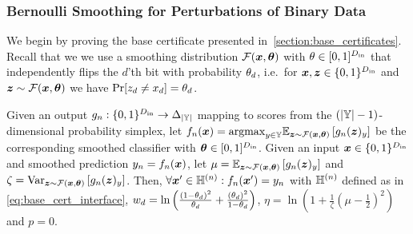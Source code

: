 \subsubsection{Bernoulli Smoothing for Perturbations of Binary Data}\label{section:appendix_bernoulli_cert}
We begin by proving the base certificate presented in~\autoref{section:base_certificates}.
Recall that we  we use a smoothing distribution
$\mathcal{F}({\bm{x}}, {\bm{\theta}})$ with ${\theta} \in [0,1]^{D_\mathrm{in}}$ that independently flips the $d$'th bit with probability ${\theta}_d$, i.e.~for ${\bm{x}}, {\bm{z}} \in \{0,1\}^{D_\mathrm{in}}$ and ${\bm{z}} \sim \mathcal{F}({\bm{x}}, {\bm{\theta}})$ we have $\Pr[{z}_d \neq {x}_d ] = {\theta}_d$. 
\begin{corollary}
Given an output $g_n : \{0,1\}^{D_\mathrm{in}} \rightarrow \Delta_{|{\mathbb{Y}}|}$ mapping to scores from the $\left(|{\mathbb{Y}}|-1\right)$-dimensional probability simplex, let 
$f_n({\bm{x}}) = \mathrm{argmax}_{y \in {\mathbb{Y}}}
\mathbb{E}_{{\bm{z}} \sim \mathcal{F}({\bm{x}}, {\bm{\theta}})}
\left[g_n({\bm{z}})_y\right]$ be the corresponding smoothed classifier with ${\bm{\theta}} \in [0,1]^{D_\mathrm{in}}$.
Given an input ${\bm{x}} \in \{0,1\}^{D_\mathrm{in}}$ and smoothed prediction ${y}_n = f_n({\bm{x}})$, 
let $\mu = \mathbb{E}_{{\bm{z}} \sim \mathcal{F}({\bm{x}}, {\bm{\theta}})}\left[g_n({\bm{z}})_y\right]$
and $\zeta = \mathrm{Var}_{{\bm{z}} \sim \mathcal{F}({\bm{x}}, {\bm{\theta}})}\left[g_n({\bm{z}})_y\right]$.
Then, $\forall {\bm{x}}' \in {\mathbb{H}}^{(n)}: f_n({\bm{x}}') = {y}_n$ with ${\mathbb{H}}^{(n)}$ defined as in \autoref{eq:base_cert_interface},
${w}_{d}=
\ln\left( \frac{\left(1 - {\theta}_d\right)^2}{{\theta}_d}
            + \frac{\left({\theta}_d\right)^2}{1 - {\theta}_d}
            \right)$,
$\eta = \ln\left(1 + \frac{1}{\zeta}\left(\mu - \frac{1}{2}\right)^2\right)$
and
$p=0$.
\end{corollary}
